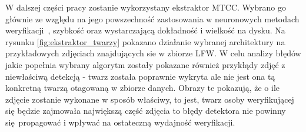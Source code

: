 W dalszej części pracy zostanie wykorzystany ekstraktor MTCC. Wybrano go głównie ze względu na jego
powszechność zastosowania w neuronowych metodach weryfikacji~\cite{Cosface,Arcface,Facenet}, szybkość oraz wystarczającą dokładność i wielkość na dysku. Na rysunku \ref{fig:ekstraktor_twarzy}
pokazano działanie wybranej architektury na przykładowych zdjęciach znajdujących sie w zbiorze
LFW. W celu analizy błędów jakie popełnia wybrany algorytm zostały pokazane
również przykłądy zdjęć z niewłaściwą detekcją - twarz została poprawnie wykryta ale nie jest ona
tą konkretną twarzą otagowaną w zbiorze danych. Obrazy te pokazują, że o ile zdjęcie zostanie wykonane w sposób właściwy, to jest, twarz osoby weryfikującej się będzie zajmowała największą część zdjęcia to błędy detektora nie powinny się propagować i wpływać na ostateczną wydajność weryfikacji.


